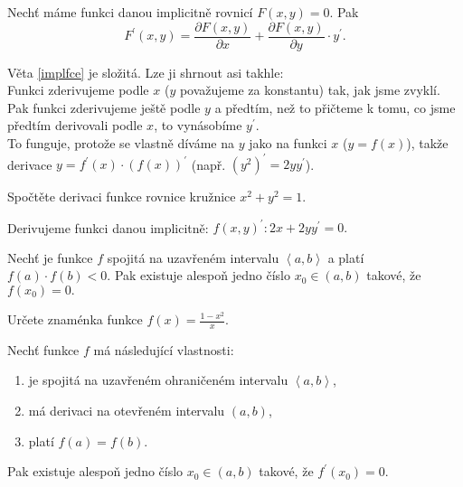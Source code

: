 \begin{veta}\label{implfce}
Nechť máme funkci danou implicitně rovnicí $F(x,y)=0$. Pak
$$F^\prime (x,y)=\frac{\partial F(x,y)}{\partial x} + \frac{\partial F(x,y)}{\partial y}\cdot y^\prime.$$
\end{veta}

\begin{pozn}
Věta \ref{implfce} je složitá. Lze ji shrnout asi takhle:\\
Funkci zderivujeme podle $x$ ($y$ považujeme za konstantu) tak, jak jsme zvyklí. Pak
funkci zderivujeme ještě podle $y$ a předtím, než to přičteme k tomu,
co jsme předtím derivovali podle $x$, to vynásobíme $y^\prime$. \\
To funguje,
protože se vlastně díváme na $y$ jako na funkci $x$ ($y=f(x)$), takže
derivace $y=f^\prime(x)\cdot (f(x))^\prime$ (např. $\left ( y^2 \right )^\prime =2yy^\prime$).
\end{pozn}

\begin{priklad}
  Spočtěte derivaci funkce rovnice kružnice $x^2+y^2=1.$
\end{priklad}

\begin{reseni}
  Derivujeme funkci danou implicitně: $f(x,y)^\prime: 2x+2yy^\prime=0.$
\end{reseni}

\begin{veta}
Nechť je funkce $f$ spojitá na uzavřeném intervalu $\left < a,b \right > $ a platí
$f(a)\cdot f(b)<0.$ Pak existuje alespoň jedno číslo $x_0\in (a,b)$ takové, že $f(x_0)=0.$
\end{veta}

\begin{priklad}
  Určete znaménka funkce $f(x)=\frac{1-x^2}{x}.$
\end{priklad}

\begin{veta}
Nechť funkce $f$ má následující vlastnosti:
\begin{enumerate}[$i.$]
\item je spojitá na uzavřeném ohraničeném intervalu $\left < a,b \right > $,
\item má derivaci na otevřeném intervalu $(a,b)$,
\item platí $f(a)=f(b)$.
\end{enumerate}
Pak existuje alespoň jedno číslo $x_0\in (a,b)$ takové, že $f^\prime(x_0)=0.$
\end{veta}

